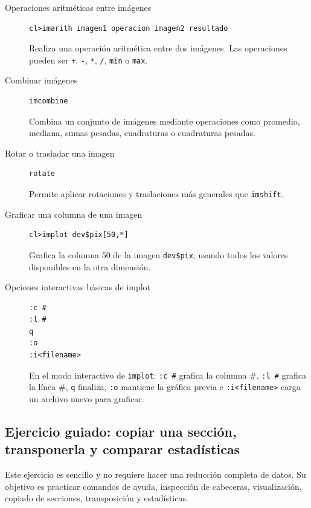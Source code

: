 \begin{description}

\item[Operaciones aritméticas entre imágenes]
\begin{verbatim}
cl>imarith imagen1 operacion imagen2 resultado
\end{verbatim}
Realiza una operación aritmética entre dos imágenes. Las operaciones pueden ser \texttt{+}, \texttt{-}, \texttt{*}, \texttt{/}, \texttt{min} o \texttt{max}.

\item[Combinar imágenes]
\begin{verbatim}
imcombine
\end{verbatim}
Combina un conjunto de imágenes mediante operaciones como promedio, mediana, sumas pesadas, cuadraturas o cuadraturas pesadas.

\item[Rotar o trasladar una imagen]
\begin{verbatim}
rotate
\end{verbatim}
Permite aplicar rotaciones y traslaciones más generales que \texttt{imshift}.

\item[Graficar una columna de una imagen]
\begin{verbatim}
cl>implot dev$pix[50,*]
\end{verbatim}
Grafica la columna 50 de la imagen \texttt{dev\$pix}, usando todos los valores disponibles en la otra dimensión.

\item[Opciones interactivas básicas de implot]
\begin{verbatim}
:c #
:l #
q
:o
:i<filename>
\end{verbatim}
En el modo interactivo de \texttt{implot}: \texttt{:c \#} grafica la columna \#, \texttt{:l \#} grafica la línea \#, \texttt{q} finaliza, \texttt{:o} mantiene la gráfica previa e \texttt{:i<filename>} carga un archivo nuevo para graficar.

\end{description}

\subsection{Ejercicio guiado: copiar una sección, transponerla y comparar estadísticas}

Este ejercicio es sencillo y no requiere hacer una reducción completa de datos. Su objetivo es practicar comandos de ayuda, inspección de cabeceras, visualización, copiado de secciones, transposición y estadísticas.

